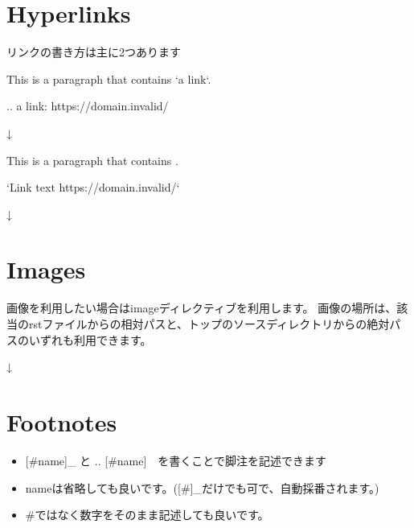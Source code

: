 \documentclass[letterpaper,10pt,dvipdfmx,openany,oneside]{sphinxmanual}
\begin{document}
\section{Hyperlinks}
\label{\detokenize{1.chapter/basic_syntax:hyperlinks}}
リンクの書き方は主に2つあります

%
\begin{sphinxVerbatim}[commandchars=\\\{\}]
This is a paragraph that contains {}`a link{}`\PYGZus{}.

.. \PYGZus{}a link: https://domain.invalid/
\end{sphinxVerbatim}

↓

This is a paragraph that contains .

%
\begin{sphinxVerbatim}[commandchars=\\\{\}]
{}`Link text \PYGZlt{}https://domain.invalid/\PYGZgt{}{}`\PYGZus{}
\end{sphinxVerbatim}

↓



\section{Images}
\label{\detokenize{1.chapter/basic_syntax:images}}
画像を利用したい場合はimageディレクティブを利用します。
画像の場所は、該当のrstファイルからの相対パスと、トップのソースディレクトリからの絶対パスのいずれも利用できます。

%
\begin{sphinxVerbatim}[commandchars=\\\{\}]
  
     
    
\end{sphinxVerbatim}

↓



\section{Footnotes}
\label{\detokenize{1.chapter/basic_syntax:footnotes}}\begin{itemize}
\item {} 
{[}\#name{]}\_ と  .. {[}\#name{]}　を書くことで脚注を記述できます

\item {} 
nameは省略しても良いです。({[}\#{]}\_だけでも可で、自動採番されます。)

\item {} 
\#ではなく数字をそのまま記述しても良いです。

\end{itemize}
\end{document}
